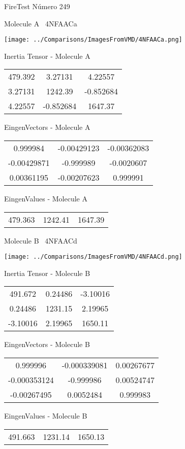 \vtab[-3cm]
\begin{center}
{\large FireTest \tab Número 249}
\end{center}
\begin{multicols}{2}
\begin{center}

Molecule A \
4NFAACa

\texttt{[image: ../Comparisons/ImagesFromVMD/4NFAACa.png]}

Inertia Tensor - Molecule A \\
\begin{tabular}{|c c c|}
479.392	 & 	3.27131	 & 	4.22557	 \\
3.27131	 & 	1242.39	 & 	-0.852684	 \\
4.22557	 & 	-0.852684	 & 	1647.37
\end{tabular}

\vtab
 EingenVectors - Molecule A     \\
\begin{tabular}{|c c c|}
0.999984	 & 	-0.00429123	 & 	-0.00362083	 \\
-0.00429871	 & 	-0.999989	 & 	-0.0020607	 \\
0.00361195	 & 	-0.00207623	 & 	0.999991
\end{tabular}

\vtab
 EingenValues - Molecule A     \\
\begin{tabular}{|c c c|}
479.363	 & 	1242.41	 & 	1647.39	 \\
\end{tabular}
\columnbreak

Molecule B \
4NFAACd

\texttt{[image: ../Comparisons/ImagesFromVMD/4NFAACd.png]}

Inertia Tensor - Molecule B \\
\begin{tabular}{|c c c|}
491.672	 & 	0.24486	 & 	-3.10016	 \\
0.24486	 & 	1231.15	 & 	2.19965	 \\
-3.10016	 & 	2.19965	 & 	1650.11
\end{tabular}

\vtab
 EingenVectors - Molecule B     \\
\begin{tabular}{|c c c|}
0.999996	 & 	-0.000339081	 & 	0.00267677	 \\
-0.000353124	 & 	-0.999986	 & 	0.00524747	 \\
-0.00267495	 & 	0.0052484	 & 	0.999983
\end{tabular}

\vtab
 EingenValues - Molecule B     \\
\begin{tabular}{|c c c|}
491.663	 & 	1231.14	 & 	1650.13	 \\
\end{tabular}

\end{center}
\end{multicols}

